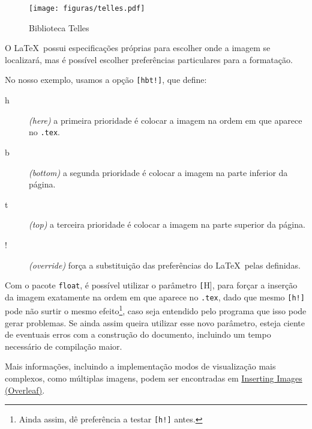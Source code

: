 \begin{figure}[hbt!]
    \centering
    \texttt{[image: figuras/telles.pdf]}
    \caption{Biblioteca Telles}
    \label{fig:telles}
\end{figure}

O \LaTeX\ possui especificações próprias para escolher onde a imagem se localizará, mas é possível escolher preferências particulares para a formatação.

No nosso exemplo, usamos a opção \texttt{[hbt!]}, que define:

\begin{description}
    \item[h] \textit{(here)} a primeira prioridade é colocar a imagem na ordem em que aparece no \texttt{.tex}.
    \item[b] \textit{(bottom)} a segunda prioridade é colocar a imagem na parte inferior da página.
    \item[t] \textit{(top)} a terceira prioridade é colocar a imagem na parte superior da página.
    \item[!] \textit{(override)} força a substituição das preferências do \LaTeX\ pelas definidas.
\end{description}

Com o pacote \texttt{float}, é possível utilizar o parâmetro \texttt[H], para forçar a inserção da imagem exatamente na ordem em que aparece no \texttt{.tex}, dado que mesmo \texttt{[h!]} pode não surtir o mesmo efeito\footnote{Ainda assim, dê preferência a testar \texttt{[h!]} antes.}, caso seja entendido pelo programa que isso pode gerar problemas. Se ainda assim queira utilizar esse novo parâmetro, esteja ciente de eventuais erros com a construção do documento, incluindo um tempo necessário de compilação maior.

Mais informações, incluindo a implementação modos de visualização mais complexos, como múltiplas imagens, podem ser encontradas em \href{https://www.overleaf.com/learn/latex/Inserting_Images}{Inserting Images (Overleaf)}.